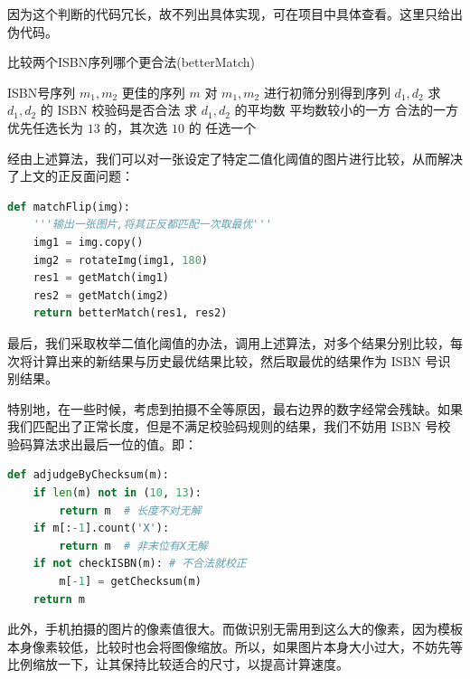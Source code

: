 \documentclass{ctexart}
\begin{document}
因为这个判断的代码冗长，故不列出具体实现，可在项目中具体查看。这里只给出伪代码。
\begin{algorithm}
    \caption{比较两个ISBN序列哪个更合法(betterMatch)}
    \label{betterMatch}
    \renewcommand{\algorithmicrequire}{\textbf{输入:}}
    \renewcommand{\algorithmicensure}{\textbf{输出:}}
    \begin{algorithmic}
        \REQUIRE ISBN号序列 $m_1,m_2$
        \ENSURE 更佳的序列 $m$
        \STATE 对 $m_1,m_2$ 进行初筛分别得到序列 $d_1,d_2$
        \STATE 求 $d_1,d_2$ 的 ISBN 校验码是否合法
        \STATE 求 $d_1,d_2$ 的平均数
        \RETURN 平均数较小的一方
        \ELSE
            \RETURN 合法的一方
            \ELSE
                \RETURN 优先任选长为 $13$ 的，其次选 $10$ 的
                \ELSE
                \RETURN 任选一个
                \ENDIF
            \ENDIF
        \ENDIF
    \end{algorithmic}
\end{algorithm}

经由上述算法，我们可以对一张设定了特定二值化阈值的图片进行比较，从而解决了上文的正反面问题：

\begin{lstlisting}[language=python]
def matchFlip(img):
    '''输出一张图片,将其正反都匹配一次取最优'''
    img1 = img.copy()
    img2 = rotateImg(img1, 180)
    res1 = getMatch(img1)
    res2 = getMatch(img2)
    return betterMatch(res1, res2)
\end{lstlisting}

最后，我们采取枚举二值化阈值的办法，调用上述算法，对多个结果分别比较，每次将计算出来的新结果与历史最优结果比较，然后取最优的结果作为 ISBN 号识别结果。

特别地，在一些时候，考虑到拍摄不全等原因，最右边界的数字经常会残缺。如果我们匹配出了正常长度，但是不满足校验码规则的结果，我们不妨用 ISBN 号校验码算法求出最后一位的值。即：

\begin{lstlisting}[language=python]
def adjudgeByChecksum(m):
    if len(m) not in (10, 13):
        return m  # 长度不对无解
    if m[:-1].count('X'):
        return m  # 非末位有X无解
    if not checkISBN(m): # 不合法就校正
        m[-1] = getChecksum(m)
    return m 
\end{lstlisting}

此外，手机拍摄的图片的像素值很大。而做识别无需用到这么大的像素，因为模板本身像素较低，比较时也会将图像缩放。所以，如果图片本身大小过大，不妨先等比例缩放一下，让其保持比较适合的尺寸，以提高计算速度。
\end{document}
